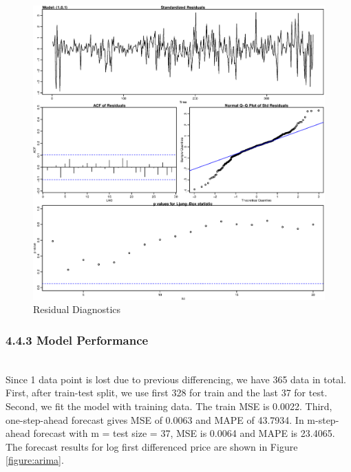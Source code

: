 \documentclass[letterpaper]{article} %
\begin{document}
\begin{figure}
    \includegraphics[width=\linewidth]{diagnosis.eps}
    \caption{Residual Diagnostics}
    \label{figure:diagnosis}
\end{figure}

\subsubsection*{4.4.3 Model Performance}~\\
Since 1 data point is lost due to previous differencing, we have 365 data in total. First, after train-test split, we use first 328 for train and the last 37 for test. Second, we fit the model with training data. The train MSE is 0.0022. Third, one-step-ahead forecast gives MSE of 0.0063 and MAPE of 43.7934. In m-step-ahead  forecast with m = test size = 37, MSE is 0.0064 and MAPE is 23.4065. The forecast results for log first differenced price are shown in Figure \ref{figure:arima}.
\end{document}

